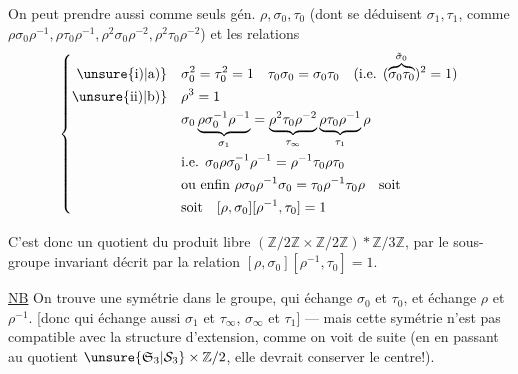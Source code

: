 On peut prendre aussi comme seuls gén. $\rho,\sigma_0,\tau_0$ (dont se déduisent $\sigma_1,\tau_1$, \inserted{$\sigma_\infty,\tau_\infty$} comme $\rho\sigma_0\rho^{-1},\rho\tau_0\rho^{-1},\rho^2\sigma_0\rho^{-2},\rho^2\tau_0\rho^{-2}$) et les relations
\[
\left\{\begin{aligned}
\unsure{\text{i)}|\text{a)}}\quad&\sigma_0^2=\tau_0^2=1\quad\tau_0\sigma_0=\sigma_0\tau_0\quad\text{(i.e. }(\overbrace{\sigma_0\tau_0}^{\tilde\sigma_0})^2=1\text{)}\\
\unsure{\text{ii)}|\text{b)}}\quad&\rho^3=1\\
&\sigma_0\underbrace{\rho\sigma_0^{-1}\rho^{-1}}_{\sigma_1}=\underbrace{\rho^2\tau_0\rho^{-2}}_{\tau_\infty}\underbrace{\rho\tau_0\rho^{-1}}_{\tau_1}\rho\\
&\text{i.e. }\sigma_0\rho\sigma_0^{-1}\rho^{-1}=\rho^{-1}\tau_0\rho\tau_0\\
&\text{ou enfin }\rho\sigma_0\rho^{-1}\sigma_0=\tau_0\rho^{-1}\tau_0\rho\quad\text{soit}\\
&\text{soit}\quad[\rho,\sigma_0][\rho^{-1},\tau_0]=1
\end{aligned}\right.
\]

C'est donc un quotient du produit libre $(\mathbb Z/2\mathbb Z\times\mathbb Z/2\mathbb Z)*\mathbb Z/3\mathbb Z$, par le sous-groupe invariant décrit par la relation $[\rho,\sigma_0][\rho^{-1},\tau_0]=1$.

\uline{NB} On trouve une symétrie dans le groupe, qui échange $\sigma_0$ et $\tau_0$, et échange $\rho$ et $\rho^{-1}$. [donc qui échange aussi $\sigma_1$ et $\tau_\infty$, $\sigma_\infty$ et $\tau_1$] --- mais cette symétrie n'est pas compatible avec la structure d'extension, comme on voit de suite (en en passant au quotient $\unsure{\mathfrak S_3|\mathcal S_3}\times\mathbb Z/2$, elle devrait conserver le centre!).
